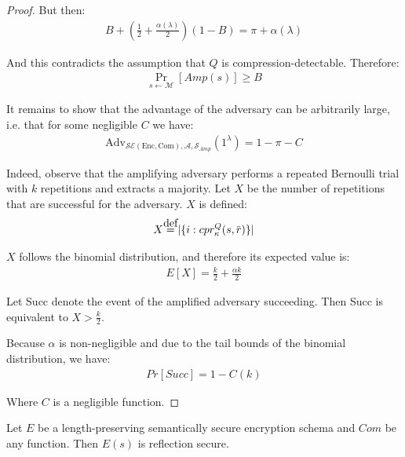 \begin{proof}
But then:
\begin{align*}
    B + (\frac{1}{2} + \frac{\alpha(\lambda)}{2})(1 - B) =
    \pi + \alpha(\lambda)
\end{align*}

And this contradicts the assumption that $Q$ is compression-detectable. Therefore:
\begin{align*}
    \Pr_{s \leftarrow \mathcal{M}}
    [Amp(s)] \geq B
\end{align*}

It remains to show that the advantage of the adversary can be
arbitrarily large, i.e. that for some negligible $C$ we have:
\begin{align*}
    \text{Adv}_{\mathcal{SE}(\textrm{Enc}, \textrm{Com}), \mathcal{A}, \mathcal{S}_{Amp}}
    (1^\lambda) = 1 - \pi - C
\end{align*}

Indeed, observe that the amplifying adversary performs a repeated Bernoulli
trial with $k$ repetitions and extracts a majority. Let $X$ be the number of
repetitions that are successful for the adversary. $X$ is defined:
\begin{align*}
    X \defeq |\{ i: cpr^Q_{\kappa}(s, \overbar{r}) \}|
\end{align*}

$X$ follows the binomial distribution, and therefore its expected value is:
\begin{align*}
    E[X] = \frac{k}{2} + \frac{\alpha k}{2}
\end{align*}

Let Succ denote the event of the amplified adversary succeeding. Then Succ
is equivalent to $X > \frac{k}{2}$.

Because $\alpha$ is non-negligible and due to the tail bounds of the binomial
distribution, we have:
\begin{align*}
    Pr[Succ] = 1 - C(k)
\end{align*}

Where $C$ is a negligible function.
\end{proof}

\begin{lemma}
    Let $E$ be a length-preserving semantically secure encryption schema and
    $Com$ be any function. Then $E(s)$ is reflection secure.
\end{lemma}

